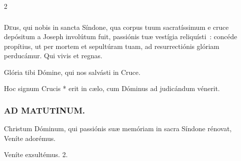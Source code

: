 \documentclass[9pt,twoside]{extarticle}
\begin{document}
\begin{multicols}{2}
\subsubsection*{\center {}}
\lettrine{D}eus, qui nobis in sancta Síndone, qua corpus tuum sacratíssimum e cruce depósitum a Joseph involútum fuit, passiónis tuæ vestígia reliquísti~: concéde propítius, ut per mortem et sepultúram tuam, ad resurrectiónis glóriam perducámur. Qui vivis et regnas.

\begin{tightlist}{}
\item {} Glória tibi Dómine, qui nos salvásti in Cruce. 
\item {} Hoc signum Crucis * erit in cælo, cum Dóminus ad judicándum vénerit.
\end{tightlist}

\subsubsection*{\center \textsc{AD MATUTINUM.}}
\begin{tightlist}{}
\item {} Christum Dóminum, qui passiónis suæ memóriam in sacra Síndone rénovat, \textred{*} Veníte adorémus.
\item {} Veníte exsultémus. 2.
\end{tightlist}


\end{multicols}
\end{document}
